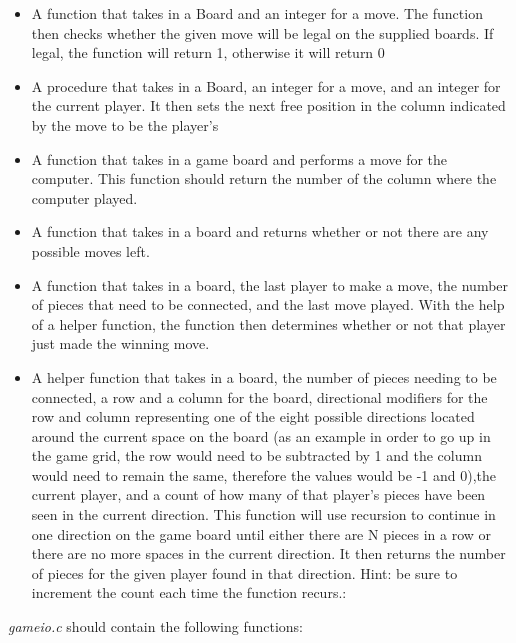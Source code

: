 \documentclass{article}
\begin{document}
\begin{itemize}
\item{A function that takes in a Board and an integer for a move. The function then checks whether the given move will be legal on the supplied boards. If legal, the function will return 1, otherwise it will return 0}
\item{A procedure that takes in a Board, an integer for a move, and an integer for the current player. It then sets the next free position in the column indicated by the move to be the player's}
\item{A function that takes in a game board and performs a move for the computer. This function should return the number of the column where the computer played.}
\item{A function that takes in a board and returns whether or not there are any possible moves left.}
\item{A function that takes in a board, the last player to make a move, the number of pieces that need to be connected, and the last move played. With the help of a helper function, the function then determines whether or not that player just made the winning move.}
\item{A helper function that takes in a board, the number of pieces needing to be connected, a row and a column for the board, directional modifiers for the row and column representing one of the eight possible directions located around the current space on the board (as an example in order to go up in the game grid, the row would need to be subtracted by 1 and the column would need to remain the same, therefore the values would be -1 and 0),the current player, and a count of how many of that player's pieces have been seen in the current direction. This function will use recursion to continue in one direction on the game board until either there are N pieces in a row or there are no more spaces in the current direction. It then returns the number of pieces for the given player found in that direction. Hint: be sure to increment the count each time the function recurs.:}
\end{itemize}

{\it gameio.c} should contain the following functions:
\end{document}
